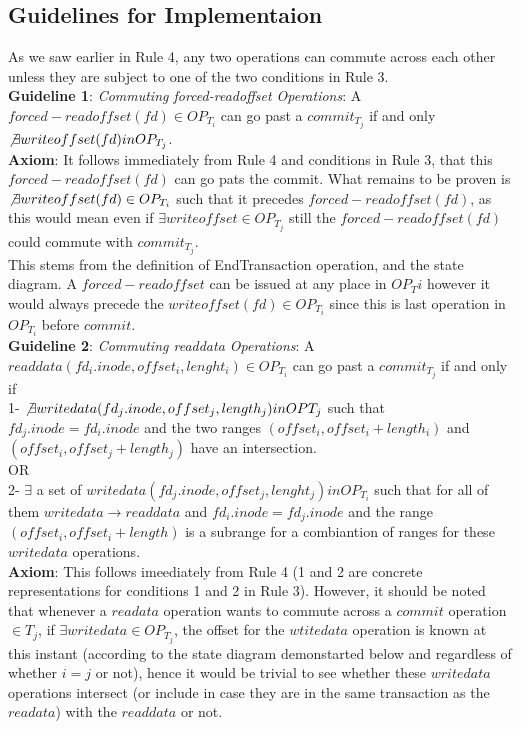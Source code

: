 \documentclass[a4paper, 11pt]{article}
\begin{document}
\subsection{Guidelines for Implementaion}

As we saw earlier in Rule 4, any two operations can commute across each other unless they are subject to one of the two conditions in Rule 3.\\  

\textbf{Guideline 1}: \emph{Commuting forced-readoffset Operations}: A $forced-readoffset(fd) \in OP_{T_i}$ can go past a $commit_{T_j}$ if and only $\not \exists writeoffset(fd) in OP_{T_j}$.\\

\textbf{Axiom}: It follows immediately from Rule 4 and conditions in Rule 3, that this $forced-readoffset(fd)$ can go pats the commit. What remains to be proven is  $ \not \exists writeoffset(fd) \in OP_{T_i}$ such that it precedes 
$forced-readoffset(fd)$, as this would mean even if $\exists writeoffset \in OP_{T_j}$ still the $forced-readoffset(fd)$ could commute with $commit_{T_j}$.\\

This stems from the definition of EndTransaction operation, and the state diagram. A $forced-readoffset$ can be issued at any place in $OP_T{i}$ however it would always precede the $writeoffset(fd) \in OP_{T_i}$ since this is last operation in $OP_{T_i}$ before $commit$.\\

\textbf{Guideline 2}: \emph{Commuting readdata Operations}: A $readdata(fd_i.inode,offset_i, lenght_i) \in OP_{T_i}$ can go past a $commit_{T_j}$ if and only if \\

1- $\not \exists writedata(fd_j.inode, offset_j, length_j) in OP{T_j}$ such that $fd_j.inode= fd_i.inode$ and the two ranges $(offset_i, offset_i + length_i)$ and $(offset_i, offset_j + length_j)$ have an intersection.\\

 OR\\

2- $\exists$ a set of $writedata(fd_j.inode,offset_j, lenght_j) in OP_{T_i}$ such that for all of them $writedata \rightarrow readdata$ and $fd_i.inode = fd_j.inode$ and the range $(offset_i, offset_i + length)$ is a subrange for a combiantion of ranges for these $writedata$ operations.\\

\textbf{Axiom}: This follows imeediately from Rule 4 (1 and 2 are concrete representations for conditions 1 and 2 in Rule 3). However, it should be noted that whenever a $readata$ operation wants to commute across a $commit$ operation $\in T_j$, if $ \exists writedata \in OP_{T_j}$, the offset for the $wtitedata$ operation is known at this instant (according to the state diagram demonstarted below and regardless of whether $i = j$ or not), hence it would be trivial to see whether these $writedata$ operations intersect (or include in case they are in the same transaction as the $readata$) with the $readdata$ or not.\\
\end{document}
